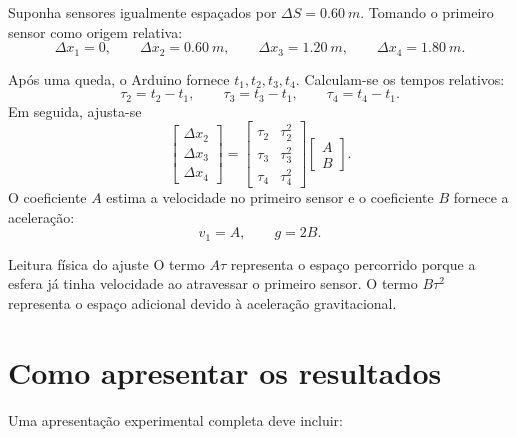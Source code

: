 \documentclass[11pt,a4paper]{article}
\begin{document}
Suponha sensores igualmente espaçados por $\Delta S=\SI{0,60}{m}$. Tomando o primeiro sensor como origem relativa:
\begin{equation}
  \Delta x_1=0,
  \qquad
  \Delta x_2=\SI{0,60}{m},
  \qquad
  \Delta x_3=\SI{1,20}{m},
  \qquad
  \Delta x_4=\SI{1,80}{m}.
\end{equation}

Após uma queda, o Arduino fornece $t_1,t_2,t_3,t_4$. Calculam-se os tempos relativos:
\begin{equation}
  \tau_2=t_2-t_1,
  \qquad
  \tau_3=t_3-t_1,
  \qquad
  \tau_4=t_4-t_1.
\end{equation}
Em seguida, ajusta-se
\begin{equation}
  \begin{bmatrix}
    \Delta x_2 \\
    \Delta x_3 \\
    \Delta x_4
  \end{bmatrix}
  =
  \begin{bmatrix}
    \tau_2 & \tau_2^2 \\
    \tau_3 & \tau_3^2 \\
    \tau_4 & \tau_4^2
  \end{bmatrix}
  \begin{bmatrix}
    A \\
    B
  \end{bmatrix}.
\end{equation}
O coeficiente $A$ estima a velocidade no primeiro sensor e o coeficiente $B$ fornece a aceleração:
\begin{equation}
  v_1=A,
  \qquad
  g=2B.
\end{equation}

\begin{caixaIdeia}{Leitura física do ajuste}
O termo $A\tau$ representa o espaço percorrido porque a esfera já tinha velocidade ao atravessar o primeiro sensor. O termo $B\tau^2$ representa o espaço adicional devido à aceleração gravitacional.
\end{caixaIdeia}

\section{Como apresentar os resultados}

Uma apresentação experimental completa deve incluir:
\end{document}
